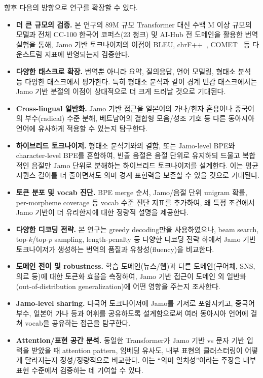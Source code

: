 \documentclass[sigconf,nonacm]{acmart}
\begin{document}
향후 다음의 방향으로 연구를 확장할 수 있다.
\begin{itemize}
    \item \textbf{더 큰 규모의 검증.} 본 연구의 89M 규모 Transformer 대신 수백 M 이상 규모의 모델과
    전체 CC-100 한국어 코퍼스(23 청크) 및 AI-Hub 전 도메인을 활용한 번역 실험을 통해,
    Jamo 기반 토크나이저의 이점이 BLEU, chrF++~\cite{popovic2017chrf}, COMET~\cite{rei2020comet} 등
    다운스트림 지표에 반영되는지 검증한다.
    \item \textbf{다양한 태스크로 확장.} 번역뿐 아니라 요약, 질의응답, 언어 모델링, 형태소 분석 등
    다양한 태스크에서 평가한다. 특히 형태소 분석과 같이 경계 민감 태스크에서는 Jamo 기반 분절의
    이점이 상대적으로 더 크게 드러날 것으로 기대된다.
    \item \textbf{Cross-lingual 일반화.} Jamo 기반 접근을 일본어의 가나/한자 혼용이나 중국어의 부수(radical)
    수준 분해, 베트남어의 결합형 모음/성조 기호 등 다른 동아시아 언어에 유사하게 적용할 수 있는지
    탐구한다.
    \item \textbf{하이브리드 토크나이저.} 형태소 분석기와의 결합, 또는 Jamo-level BPE와
    character-level BPE를 혼합하여, 빈출 음절은 음절 단위로 유지하되 드물고 복합적인 음절만 Jamo 단위로
    분해하는 하이브리드 토크나이저를 설계한다. 이는 평균 시퀀스 길이를 더 줄이면서도 의미 경계 표현력을
    보존할 수 있을 것으로 기대된다.
    \item \textbf{토큰 분포 및 vocab 진단.} BPE merge 순서, Jamo/음절 단위 unigram 확률,
    per-morpheme coverage 등 vocab 수준 진단 지표를 추가하여, 왜 특정 조건에서 Jamo 기반이
    더 유리한지에 대한 정량적 설명을 제공한다.
    \item \textbf{다양한 디코딩 전략.} 본 연구는 greedy decoding만을 사용하였으나, beam search,
    top-$k$/top-$p$ sampling, length-penalty 등 다양한 디코딩 전략 하에서 Jamo 기반 토크나이저가
    생성하는 번역의 품질과 유창성(fluency)을 비교한다.
    \item \textbf{도메인 전이 및 robustness.} 학습 도메인(뉴스/웹)과 다른 도메인(구어체, SNS, 의료 등)에
    대한 토큰화 효율을 측정하여, Jamo 기반 접근이 도메인 외 일반화(out-of-distribution generalization)에
    어떤 영향을 주는지 조사한다.
    \item \textbf{Jamo-level sharing.} 다국어 토크나이저에 Jamo를 기저로 포함시키고, 중국어 부수,
    일본어 가나 등과 어휘를 공유하도록 설계함으로써 여러 동아시아 언어에 걸쳐 vocab을 공유하는 접근을
    탐구한다.
    \item \textbf{Attention/표현 공간 분석.} 동일한 Transformer가 Jamo 기반 vs 문자 기반 입력을 받았을 때
    attention pattern, 임베딩 유사도, 내부 표현의 클러스터링이 어떻게 달라지는지 정성/정량적으로
    비교한다. 이는 ``의미 일치성''이라는 주장을 내부 표현 수준에서 검증하는 데 기여할 수 있다.
\end{itemize}
\end{document}
